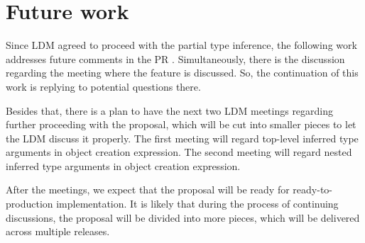 \chapter{Future work} \label{sect14:future}

Since \ac{LDM} agreed to proceed with the partial type inference, the following work addresses future comments in the PR \cite{online:pull2}. 
Simultaneously, there is the discussion \cite{online:mettingSummaryDisc} regarding the meeting where the feature is discussed. 
So, the continuation of this work is replying to potential questions there.
\par
Besides that, there is a plan to have the next two \ac{LDM} meetings regarding further proceeding with the proposal, which will be cut into smaller pieces to let the LDM discuss it properly. 
The first meeting will regard top-level inferred type arguments in object creation expression. 
The second meeting will regard nested inferred type arguments in object creation expression.
\par
After the meetings, we expect that the proposal will be ready for ready-to-production implementation. 
It is likely that during the process of continuing discussions, the proposal will be divided into more pieces, which will be delivered across multiple releases.